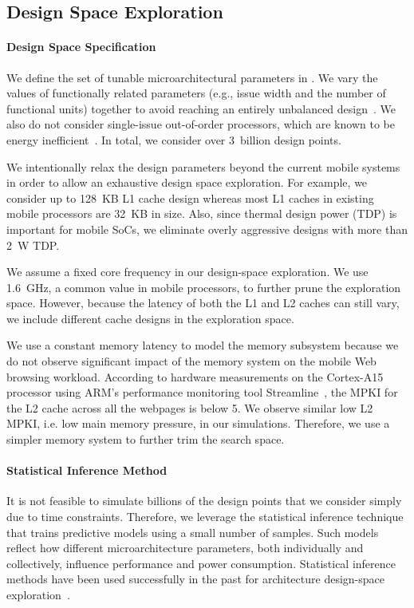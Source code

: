 \subsection{Design Space Exploration}
\label{sec:arch:customization:dse}

\paragraph{Design Space Specification} We define the set of tunable microarchitectural parameters in . We vary the values of functionally related parameters (e.g., issue width and the number of functional units) together to avoid reaching an entirely unbalanced design~\cite{ilp2}. We also do not consider single-issue out-of-order processors, which are known to be energy inefficient~\cite{marginal}. In total, we consider over 3~billion design points.



We intentionally relax the design parameters beyond the current mobile systems in order to allow an exhaustive design space exploration. For example, we consider up to 128~KB L1 cache design whereas most L1 caches in existing mobile processors are 32~KB in size. Also, since thermal design power (TDP) is important for mobile SoCs, we eliminate overly aggressive designs with more than 2~W TDP.

We assume a fixed core frequency in our design-space exploration. We use 1.6~GHz, a common value in mobile processors, to further prune the exploration space. However, because the latency of both the L1 and L2 caches can still vary, we include different cache designs in the exploration space.

We use a constant memory latency to model the memory subsystem because we do not observe significant impact of the memory system on the mobile Web browsing workload. According to hardware measurements on the Cortex-A15 processor using ARM's performance monitoring tool Streamline~\cite{streamline}, the MPKI for the L2 cache across all the webpages is below 5. We observe similar low L2 MPKI, i.e. low main memory pressure, in our simulations. Therefore, we use a simpler memory system to further trim the search space.

\paragraph{Statistical Inference Method} It is not feasible to simulate billions of the design points that we consider simply due to time constraints. Therefore, we leverage the statistical inference technique that trains predictive models using a small number of samples. Such models reflect how different microarchitecture parameters, both individually and collectively, influence performance and power consumption. Statistical inference methods have been used successfully in the past for architecture design-space exploration~\cite{dse,comt}.


